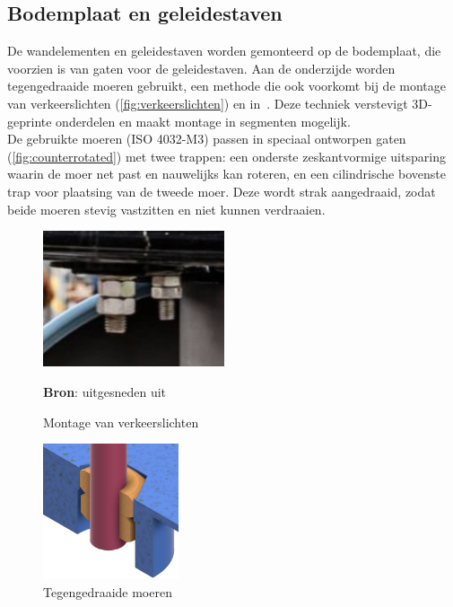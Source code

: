 \subsection{Bodemplaat en geleidestaven}
De wandelementen en geleidestaven worden gemonteerd op de bodemplaat, die voorzien is van gaten voor de geleidestaven. Aan de onderzijde worden tegengedraaide moeren gebruikt, een methode die ook voorkomt bij de montage van verkeerslichten (\autoref{fig:verkeerslichten}) en in\ \cite{RN40}. Deze techniek verstevigt 3D-geprinte onderdelen en maakt montage in segmenten mogelijk.
\\[12pt]De gebruikte moeren (ISO 4032-M3) passen in speciaal ontworpen gaten (\autoref{fig:counterrotated}) met twee trappen: een onderste zeskantvormige uitsparing waarin de moer net past en nauwelijks kan roteren, en een cilindrische bovenste trap voor plaatsing van de tweede moer. Deze wordt strak aangedraaid, zodat beide moeren stevig vastzitten en niet kunnen verdraaien.
\\[12pt]\begin{minipage}[t]{0.49\textwidth}
    \vspace{0pt}
    \begin{figure}[H]
        \centering
        \captionsetup{width=1\textwidth} %
        \includegraphics[height=4cm]{figures/verkeerssituaties48.jpg}
        \caption{Montage van verkeerslichten}\label{fig:verkeerslichten}
        \textbf{Bron}: uitgesneden uit\ \cite{RN39}
    \end{figure}
\end{minipage}
\begin{minipage}[t]{0.49\textwidth}
    \begin{figure}[H]
        \centering
        \captionsetup{width=1\textwidth} %
        \includegraphics[height=4cm]{figures/InterlockingScrews.png}
        \caption{Tegengedraaide moeren}\label{fig:counterrotated}
    \end{figure}
\end{minipage}\\[12pt]
